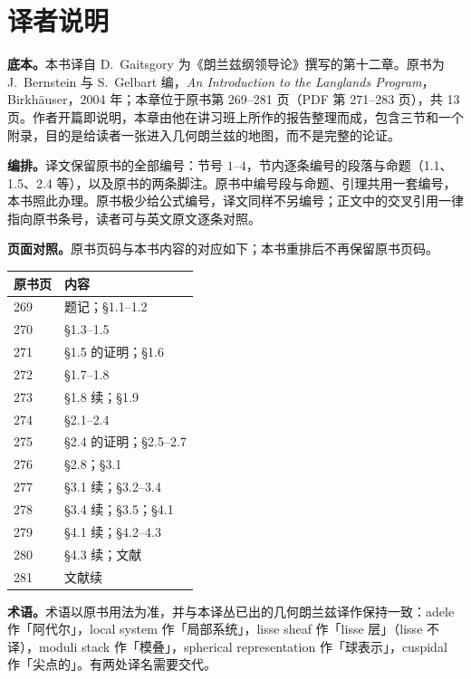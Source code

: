 \chapter*{译者说明}

\textbf{底本。}本书译自 D.~Gaitsgory 为《朗兰兹纲领导论》撰写的第十二章。原书为 J.~Bernstein 与 S.~Gelbart 编，\emph{An Introduction to the Langlands Program}，Birkhäuser，2004 年；本章位于原书第 269--281 页（PDF 第 271--283 页），共 13 页。作者开篇即说明，本章由他在讲习班上所作的报告整理而成，包含三节和一个附录，目的是给读者一张进入几何朗兰兹的地图，而不是完整的论证。

\textbf{编排。}译文保留原书的全部编号：节号 $1$--$4$，节内逐条编号的段落与命题（1.1、1.5、2.4 等），以及原书的两条脚注。原书中编号段与命题、引理共用一套编号，本书照此办理。原书极少给公式编号，译文同样不另编号；正文中的交叉引用一律指向原书条号，读者可与英文原文逐条对照。

\textbf{页面对照。}原书页码与本书内容的对应如下；本书重排后不再保留原书页码。

\begin{center}\small
\begin{tabular}{ll}
\hline
原书页 & 内容 \\
\hline
269 & 题记；\S1.1--1.2 \\
270 & \S1.3--1.5 \\
271 & \S1.5 的证明；\S1.6 \\
272 & \S1.7--1.8 \\
273 & \S1.8 续；\S1.9 \\
274 & \S2.1--2.4 \\
275 & \S2.4 的证明；\S2.5--2.7 \\
276 & \S2.8；\S3.1 \\
277 & \S3.1 续；\S3.2--3.4 \\
278 & \S3.4 续；\S3.5；\S4.1 \\
279 & \S4.1 续；\S4.2--4.3 \\
280 & \S4.3 续；文献 \\
281 & 文献续 \\
\hline
\end{tabular}
\end{center}

\textbf{术语。}术语以原书用法为准，并与本译丛已出的几何朗兰兹译作保持一致：adele 作「阿代尔」，local system 作「局部系统」，lisse sheaf 作「lisse 层」（lisse 不译），moduli stack 作「模叠」，spherical representation 作「球表示」，cuspidal 作「尖点的」。有两处译名需要交代。

